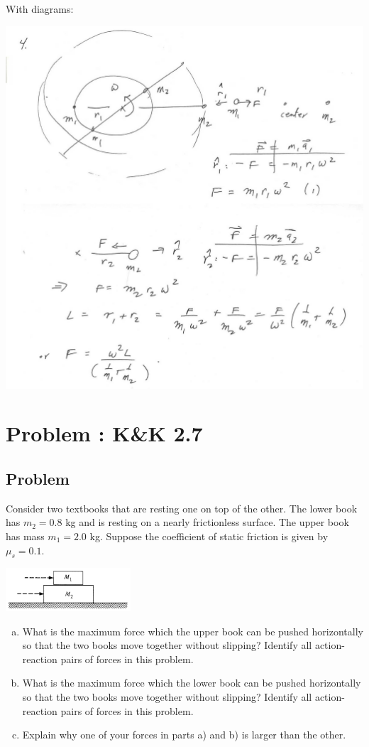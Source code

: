 \documentclass[solutions]{esg8012pset}
\begin{document}
  \noindent With diagrams:
  \begin{center}\includegraphics[width=\textwidth]{ps02_Solution_Problem_2}\end{center}
\section{Problem \thesection: K\&K 2.7}
\subsection{Problem}
  Consider two textbooks that are resting one on top of the other. The lower book has $m_2 = 0.8$ kg and is resting on a nearly frictionless surface. The upper book has mass $m_1 = 2.0$ kg. Suppose the coefficient of static friction is given by $\mu_s = 0.1$.
  \begin{center}\includegraphics[width=0.35\textwidth]{ps02_2}\end{center}
  \begin{enumerate}[a)]
    \item What is the maximum force which the upper book can be pushed horizontally so that the two books move together without slipping? Identify all action-reaction pairs of forces in this problem.
    \item What is the maximum force which the lower book can be pushed horizontally so that the two books move together without slipping? Identify all action-reaction pairs of forces in this problem.
    \item Explain why one of your forces in parts a) and b) is larger than the other.
  \end{enumerate}
\end{document}
